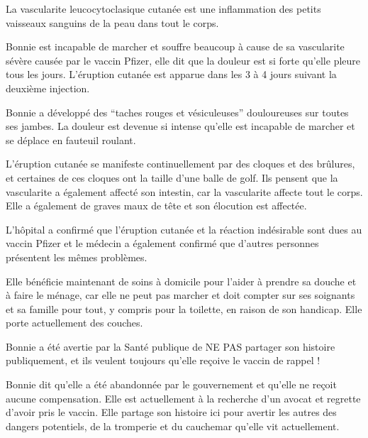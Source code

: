 La vascularite leucocytoclasique cutanée est une inflammation des petits
vaisseaux sanguins de la peau dans tout le corps.

Bonnie est incapable de marcher et souffre beaucoup à cause de sa vascularite
sévère causée par le vaccin Pfizer, elle dit que la douleur est si forte qu'elle
pleure tous les jours. L'éruption cutanée est apparue dans les 3 à 4 jours
suivant la deuxième injection.

Bonnie a développé des “taches rouges et vésiculeuses” douloureuses sur toutes
ses jambes. La douleur est devenue si intense qu'elle est incapable de marcher
et se déplace en fauteuil roulant.

L'éruption cutanée se manifeste continuellement par des cloques et des brûlures,
et certaines de ces cloques ont la taille d'une balle de golf. Ils pensent que
la vascularite a également affecté son intestin, car la vascularite affecte tout
le corps. Elle a également de graves maux de tête et son élocution est affectée.

L'hôpital a confirmé que l'éruption cutanée et la réaction indésirable sont dues
au vaccin Pfizer et le médecin a également confirmé que d'autres personnes
présentent les mêmes problèmes.

Elle bénéficie maintenant de soins à domicile pour l'aider à prendre sa douche
et à faire le ménage, car elle ne peut pas marcher et doit compter sur ses
soignants et sa famille pour tout, y compris pour la toilette, en raison de son
handicap. Elle porte actuellement des couches.

Bonnie a été avertie par la Santé publique de NE PAS partager son histoire
publiquement, et ils veulent toujours qu'elle reçoive le vaccin de rappel !

Bonnie dit qu'elle a été abandonnée par le gouvernement et qu'elle ne reçoit
aucune compensation. Elle est actuellement à la recherche d'un avocat et
regrette d'avoir pris le vaccin. Elle partage son histoire ici pour avertir les
autres des dangers potentiels, de la tromperie et du cauchemar qu'elle vit
actuellement.

